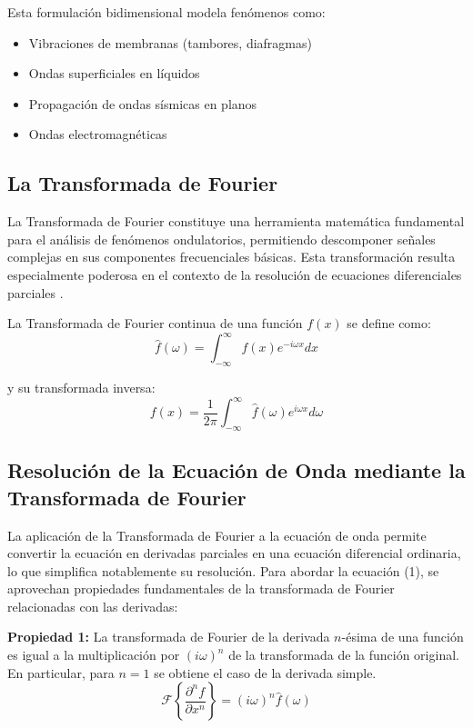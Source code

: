 \documentclass[a4paper]{article}
\begin{document}
Esta formulación bidimensional modela fenómenos como:

\begin{itemize}
    \item Vibraciones de membranas (tambores, diafragmas)
    \item Ondas superficiales en líquidos
    \item Propagación de ondas sísmicas en planos
    \item Ondas electromagnéticas
\end{itemize}

\subsection{La Transformada de Fourier}

La Transformada de Fourier constituye una herramienta matemática fundamental para el análisis de fenómenos ondulatorios, permitiendo
descomponer señales complejas en sus componentes frecuenciales básicas. Esta transformación resulta especialmente poderosa en el
contexto de la resolución de ecuaciones diferenciales parciales \cite{strang2007computational}.

La Transformada de Fourier continua de una función $f(x)$ se define como:
\begin{equation}
    \hat{f}(\omega) = \int_{-\infty}^{\infty} f(x) e^{-i\omega x} dx
\end{equation}

y su transformada inversa:
\begin{equation}
    f(x) = \frac{1}{2\pi} \int_{-\infty}^{\infty} \hat{f}(\omega) e^{i\omega x} d\omega
\end{equation}

\subsection{Resolución de la Ecuación de Onda mediante la Transformada de Fourier}

La aplicación de la Transformada de Fourier a la ecuación de onda permite convertir la ecuación en derivadas parciales en una ecuación diferencial ordinaria,
lo que simplifica notablemente su resolución. Para abordar la ecuación (1), se aprovechan propiedades fundamentales de la transformada de Fourier relacionadas con las derivadas:

\textbf{Propiedad 1:} La transformada de Fourier de la derivada $n$-ésima de una función es igual a la multiplicación por $(i\omega)^n$ de la transformada de la función original. En particular, para $n=1$ se obtiene el caso de la derivada simple.
\begin{equation}
    \mathcal{F}\left\{\frac{\partial^n f}{\partial x^n}\right\} = (i\omega)^n \hat{f}(\omega)
\end{equation}
\end{document}
